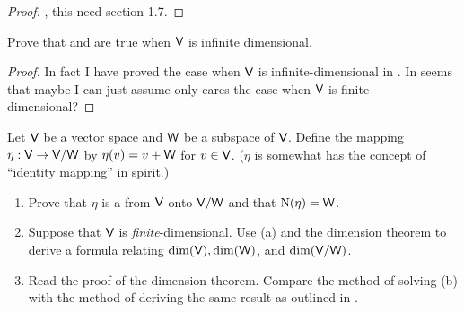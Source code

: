 \begin{proof}
\TODOREF{} , this need section 1.7.
\end{proof}

\begin{exercise} \label{exercise 2.1.41}
Prove that  and  are true when \(\textsf{V}\) is infinite dimensional.
\end{exercise}

\begin{proof}
In fact I have proved the case when \(\textsf{V}\) is infinite-dimensional in .
In seems that maybe I can just assume  only cares the case when \(\textsf{V}\) is finite dimensional?
\end{proof}

\begin{exercise} \label{exercise 2.1.42}
Let \(\textsf{V}\) be a vector space and \(\textsf{W}\) be a subspace of \(\textsf{V}\).
Define the mapping \(\eta: \textsf{V} \to \textsf{V}/\textsf{W}\) by \(\eta(v) = v + \textsf{W}\) for \(v \in \textsf{V}\).
(\(\eta\) is somewhat has the concept of ``identity mapping'' in spirit.)
\begin{enumerate}
\item Prove that \(\eta\) is a \LTRAN{} from \(\textsf{V}\) onto \(\textsf{V}/\textsf{W}\) and that \(\mathrm{N}(\eta) = \textsf{W}\).
\item Suppose that \(\textsf{V}\) is \emph{finite}-dimensional.
    Use (a) and the dimension theorem  to derive a formula relating \(\dim(\textsf{V}), \dim(\textsf{W})\), and \(\dim(\textsf{V}/\textsf{W})\).
\item Read the proof of the dimension theorem.
    Compare the method of solving (b) with the method of deriving the same result as outlined in .
\end{enumerate}
\end{exercise}

